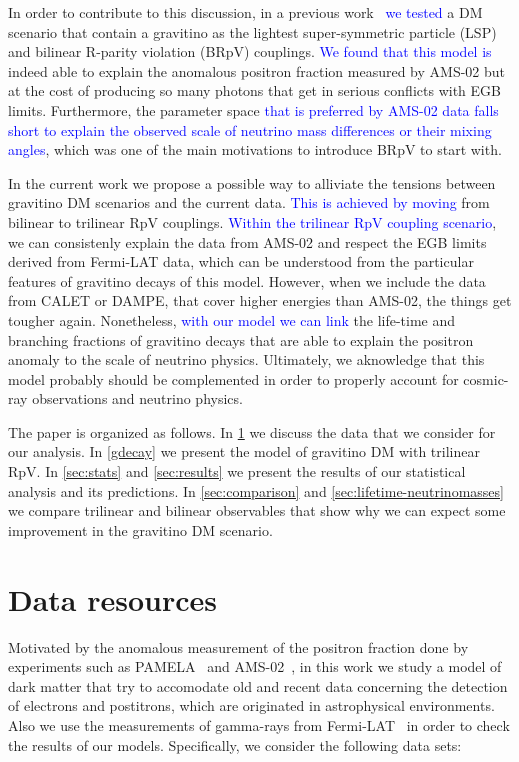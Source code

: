 \documentclass[a4paper,11pt]{article}
\newcommand*{\blue}{\textcolor{blue}}
\begin{document}
In order to contribute to this discussion, in a previous work~\cite{Carquin:2015uma} \blue{we tested} a DM scenario that contain a gravitino as the lightest super-symmetric particle (LSP) and bilinear R-parity violation (BRpV) couplings. \blue{We found that this model is} indeed able to explain the anomalous positron fraction measured by AMS-02 but at the cost of producing so many photons that get in serious conflicts with EGB limits. Furthermore, the parameter space \blue{that is preferred by AMS-02 data falls short to explain the observed scale of neutrino mass differences or their mixing angles}, which was one of the main motivations to introduce BRpV to start with.

In the current work we propose a possible way to alliviate the tensions between gravitino DM scenarios and the current data. \blue{This is achieved by moving} from bilinear to trilinear RpV couplings. \blue{Within the trilinear RpV coupling scenario}, we can consistenly explain the data from AMS-02 and respect the EGB limits derived from Fermi-LAT data, which can be understood from the particular features of gravitino decays of this model. However, when we include the data from CALET or DAMPE, that cover higher energies than AMS-02, the things get tougher again. Nonetheless, \blue{with our model we can link} the life-time and branching fractions of gravitino decays that are able to explain the positron anomaly to the scale of neutrino physics. Ultimately, we aknowledge that this model probably should be complemented in order to properly account for cosmic-ray observations and neutrino physics.

The paper is organized as follows. In \cref{sec:DS} we discuss the data that we consider for our analysis. In \cref{gdecay} we present the model of gravitino DM with trilinear RpV. In \cref{sec:stats} and \cref{sec:results} we present the results of our statistical analysis and its predictions. In \cref{sec:comparison} and \cref{sec:lifetime-neutrinomasses} we compare trilinear and bilinear observables that show why we can expect some improvement in the gravitino DM scenario. 


\section{Data resources}
\label{sec:DS}

Motivated by the anomalous measurement of the positron fraction done by experiments such as PAMELA~\cite{Adriani:2008zr} and AMS-02~\cite{Accardo:2014lma}, in this work we study a model of dark matter that try to accomodate old and recent data concerning the detection of electrons and postitrons, which are originated in astrophysical environments. Also we use the measurements of gamma-rays from Fermi-LAT~\cite{Ackermann:2014usa} in order to check the results of our models. Specifically, we consider the following data sets:
\end{document}

